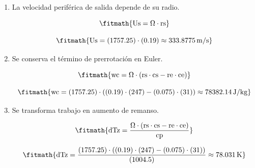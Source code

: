 \begin{enumerate}

\item La velocidad periférica de salida depende de su radio.

\[\fitmath{\mathrm{Us}=\Omega\cdot \mathrm{rs}}\]

\[\fitmath{\mathrm{Us}=(1757.25)\cdot (0.19)\approx 333.8775\,\mathrm{m/s}}\]

\item Se conserva el término de prerrotación en Euler.

\[\fitmath{\mathrm{wc}=\Omega\cdot \left(\mathrm{rs}\cdot \mathrm{cs}-\mathrm{re}\cdot \mathrm{ce}\right)}\]

\[\fitmath{\mathrm{wc}=(1757.25)\cdot \left((0.19)\cdot (247)-(0.075)\cdot (31)\right)\approx 78382.14\,\mathrm{J/kg}}\]

\item Se transforma trabajo en aumento de remanso.

\[\fitmath{\mathrm{dTz}=\frac{\Omega\cdot \left(\mathrm{rs}\cdot \mathrm{cs}-\mathrm{re}\cdot \mathrm{ce}\right)}{\mathrm{cp}}}\]

\[\fitmath{\mathrm{dTz}=\frac{(1757.25)\cdot \left((0.19)\cdot (247)-(0.075)\cdot (31)\right)}{(1004.5)}\approx 78.031\,\mathrm{K}}\]

\end{enumerate}
